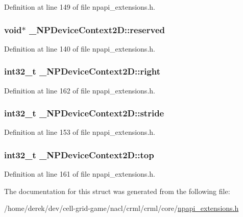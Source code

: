 Definition at line 149 of file npapi\_\-extensions.h.

\hypertarget{struct___n_p_device_context2_d_a220328788843ba392656ac2f5bf244fe}{
\subsubsection[{reserved}]{\setlength{\rightskip}{0pt plus 5cm}void$\ast$ {\bf \_\-NPDeviceContext2D::reserved}}}
\label{struct___n_p_device_context2_d_a220328788843ba392656ac2f5bf244fe}


Definition at line 140 of file npapi\_\-extensions.h.

\hypertarget{struct___n_p_device_context2_d_a9ad6524791eef11231d81588ddd2344f}{
\subsubsection[{right}]{\setlength{\rightskip}{0pt plus 5cm}int32\_\-t {\bf \_\-NPDeviceContext2D::right}}}
\label{struct___n_p_device_context2_d_a9ad6524791eef11231d81588ddd2344f}


Definition at line 162 of file npapi\_\-extensions.h.

\hypertarget{struct___n_p_device_context2_d_acc18333c582d999cd4b41fac75dd7f10}{
\subsubsection[{stride}]{\setlength{\rightskip}{0pt plus 5cm}int32\_\-t {\bf \_\-NPDeviceContext2D::stride}}}
\label{struct___n_p_device_context2_d_acc18333c582d999cd4b41fac75dd7f10}


Definition at line 153 of file npapi\_\-extensions.h.

\hypertarget{struct___n_p_device_context2_d_a1271a86a210f0290e00457984a518bf4}{
\subsubsection[{top}]{\setlength{\rightskip}{0pt plus 5cm}int32\_\-t {\bf \_\-NPDeviceContext2D::top}}}
\label{struct___n_p_device_context2_d_a1271a86a210f0290e00457984a518bf4}


Definition at line 161 of file npapi\_\-extensions.h.



The documentation for this struct was generated from the following file:\begin{DoxyCompactItemize}
\item 
/home/derek/dev/cell-\/grid-\/game/nacl/crml/crml/core/\hyperlink{npapi__extensions_8h}{npapi\_\-extensions.h}\end{DoxyCompactItemize}
